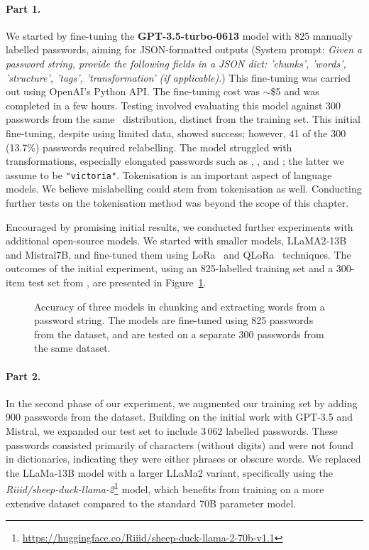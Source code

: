 \paragraph{Part 1.} We started by fine-tuning the \textbf{GPT-3.5-turbo-0613} model with 825 manually labelled passwords, aiming for JSON-formatted outputs (System prompt: \textit{Given a password string, provide the following fields in a JSON dict: 'chunks', 'words', 'structure', 'tags', 'transformation' (if applicable)}.) This fine-tuning was carried out using OpenAI's Python API. The fine-tuning cost was $\sim$\$5 and was completed in a few hours. Testing involved evaluating this model against 300 passwords from the same \phpbb\ distribution, distinct from the training set. This initial fine-tuning, despite using limited data, showed success; however, 41 of the 300 (13.7\%) passwords required relabelling. The model struggled with transformations, especially elongated passwords such as , , and ; the latter we assume to be \texttt{"victoria"}. Tokenisation is an important aspect of language models. We believe mislabelling could stem from tokenisation as well. Conducting further tests on the tokenisation method was beyond the scope of this chapter.


Encouraged by promising initial results, we conducted further experiments with additional open-source models. We started with smaller models, LLaMA2-13B and Mistral7B, and fine-tuned them using LoRa~\cite{Hu_Shen_et_al_2021} and QLoRa~\cite{Dettmers_Pagnoni_Holtzman_Zettlemoyer_2023} techniques. The outcomes of the initial experiment, using an 825-labelled training set and a 300-item test set from \phpbb, are presented in Figure~\ref{fig:300comp}.

\begin{figure}[t]
    \centering
    \scalebox{1}{}
    \caption{Accuracy of three models in chunking and extracting words from a password string. The models are fine-tuned using 825 passwords from the \phpbb dataset, and are tested on a separate 300 passwords from the same dataset.}
    \label{fig:300comp}
\end{figure}

%   
\paragraph{Part 2.} In the second phase of our experiment, we augmented our training set by adding 900 passwords from the \hmail dataset. Building on the initial work with GPT-3.5 and Mistral, we expanded our test set to include 3\,062 labelled \hmail passwords. These passwords consisted primarily of characters (without digits) and were not found in dictionaries, indicating they were either phrases or obscure words. We replaced the LLaMa-13B model with a larger LLaMa2 variant, specifically using the \textit{Riiid/sheep-duck-llama-2}\footnote{\url{https://huggingface.co/Riiid/sheep-duck-llama-2-70b-v1.1}} \cite{mukherjee2023orca, platypus2023, Orca-best} model, which benefits from training on a more extensive dataset compared to the standard 70B parameter model.

